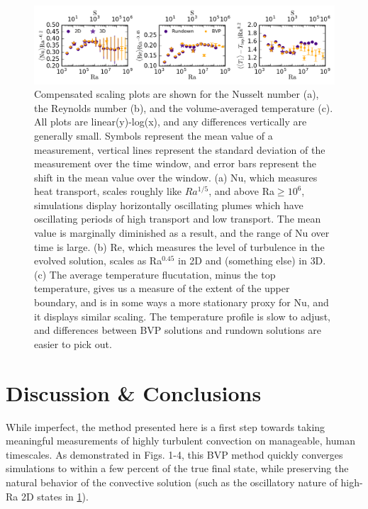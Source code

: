 \documentclass[aps, pre, onecolumn, nofootinbib, notitlepage, groupedaddress, amsfonts, amssymb, amsmath, longbibliography]{revtex4-1}
\begin{document}
\begin{figure}[t]
\includegraphics[width=\textwidth]{./figs/parameter_space_comparison.png}
\caption{Compensated scaling plots are shown for the Nusselt number (a), the
Reynolds number (b), and the volume-averaged temperature (c).  All plots are linear(y)-log(x),
and any differences vertically are generally small.  Symbols represent the mean value of
a measurement, vertical lines represent the standard deviation of the measurement over the
time window, and error bars represent the shift in the mean value over the window.
(a) Nu, which measures heat transport, scales roughly like $Ra^{1/5}$, and above Ra$\geq 10^6$,
simulations display horizontally oscillating plumes which have oscillating periods of high transport
and low transport.  The mean value is marginally diminished as a result, and the range of Nu over time
is large. (b) Re, which measures the level of turbulence in the evolved solution, scales as
Ra$^{0.45}$ in 2D and (something else) in 3D. (c) The average temperature flucutation, minus the top
temperature, gives us a measure of the extent of the upper boundary, and is in some ways a more stationary
proxy for Nu, and it displays similar scaling.  The temperature profile is slow to adjust, and differences between
BVP solutions and rundown solutions are easier to pick out.
\label{fig:parameter_space_comparison} }
\end{figure}



\section{Discussion \& Conclusions}
\label{sec:results}
While imperfect, the method presented here is a first step towards taking meaningful measurements
of highly turbulent convection on manageable, human timescales.  As demonstrated in Figs.
1-4, this BVP method quickly converges simulations to within a few percent of the true final
state, while preserving the natural behavior of the convective solution (such as the oscillatory
nature of high-Ra 2D states in \ref{fig:parameter_space_comparison}).  
\end{document}
